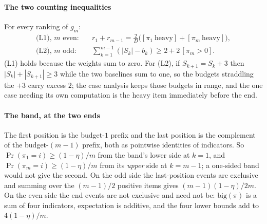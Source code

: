 \paragraph{The two counting inequalities} For every ranking of $g_{m}$:
\begin{align*}
\text{(L1), $m$ even:}\quad & r_{1}+r_{m-1}=\tfrac{2}{D}\bigl([\pi_{1}\ \text{heavy}]
  +[\pi_{m}\ \text{heavy}]\bigr),\\
\text{(L2), $m$ odd:}\quad & \textstyle\sum_{k=1}^{m-1}(|S_{k}|-b_{k})\ge
  2+2\,[\pi_{m}>0].
\end{align*}
(L1) holds because the weights sum to zero. For (L2), if $S_{k+1}=S_{k}+3$ then
$|S_{k}|+|S_{k+1}|\ge3$ while the two baselines sum to one, so the budgets straddling the
$+3$ carry excess $2$; the case analysis keeps those budgets in range, and the one case
needing its own computation is the heavy item immediately before the end.


\paragraph{The band, at the two ends} The first position is the budget-$1$ prefix and the
last position is the complement of the budget-$(m-1)$ prefix, both as pointwise identities
of indicators. So $\Pr(\pi_{1}=i)\ge(1-\eta)/m$ from the band's lower side at $k=1$, and
$\Pr(\pi_{m}=i)\ge(1-\eta)/m$ from its \emph{upper} side at $k=m-1$; a one-sided band would
not give the second. On the odd side the last-position events are exclusive and summing over
the $(m-1)/2$ positive items gives $(m-1)(1-\eta)/2m$. On the even side the end events are
not exclusive and need not be: $\mathrm{big}(\pi)$ is a sum of four indicators, expectation
is additive, and the four lower bounds add to $4(1-\eta)/m$.


